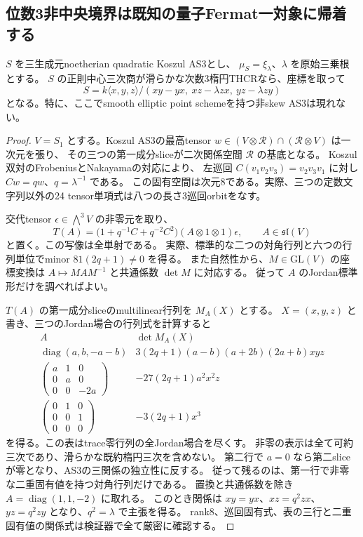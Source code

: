 \subsection{位数3非中央境界は既知の量子Fermat一対象に帰着する}
\label{subsec:normal-order3-coverage}
\begin{lemma}
\label{lem:scalar-mu3-elliptic-quantum}
$S$ を三生成元noetherian quadratic Koszul AS3とし、
$\mu_S=\xi_\lambda$、$\lambda$ を原始三乗根とする。
$S$ の正則中心三次商が滑らかな次数3楕円THCRなら、座標を取って
\[
 S=k\langle x,y,z\rangle/(xy-yx,\ xz-\lambda zx,\ yz-\lambda zy)
\]
となる。特に、ここでsmooth elliptic point schemeを持つ非skew AS3は現れない。
\end{lemma}
\begin{proof}
$V=S_1$ とする。Koszul AS3の最高tensor
$w\in(V\otimes\mathcal R)\cap(\mathcal R\otimes V)$ は一次元を張り、
その三つの第一成分sliceが二次関係空間 $\mathcal R$ の基底となる。
Koszul双対のFrobeniusとNakayamaの対応\cite{RRZ}により、
左巡回 $C(v_1v_2v_3)=v_2v_3v_1$ に対し
$Cw=qw$、$q=\lambda^{-1}$ である。
この固有空間は次元8である。実際、三つの定数文字列以外の24 tensor単項式は八つの長さ3巡回orbitをなす。

交代tensor $\epsilon\in\bigwedge^3V$ の非零元を取り、
\[
 T(A)=\bigl(1+q^{-1}C+q^{-2}C^2\bigr)(A\otimes1\otimes1)\epsilon,
 \qquad A\in\mathfrak{sl}(V)
\]
と置く。この写像は全単射である。
実際、標準的な二つの対角行列と六つの行列単位でminor $81(2q+1)\ne0$ を得る。
また自然性から、$M\in\mathrm{GL}(V)$ の座標変換は
$A\mapsto MAM^{-1}$ と共通係数 $\det M$ に対応する。
従って $A$ のJordan標準形だけを調べればよい。

$T(A)$ の第一成分sliceのmultilinear行列を $M_A(X)$ とする。
$X=(x,y,z)$ と書き、三つのJordan場合の行列式を計算すると
\[
\begin{array}{c|l}
 A&\det M_A(X)\\\hline
 \operatorname{diag}(a,b,-a-b)&
 3(2q+1)(a-b)(a+2b)(2a+b)xyz\\
 \begin{pmatrix}a&1&0\\0&a&0\\0&0&-2a\end{pmatrix}&
 -27(2q+1)a^2x^2z\\
 \begin{pmatrix}0&1&0\\0&0&1\\0&0&0\end{pmatrix}&
 -3(2q+1)x^3
\end{array}
\]
を得る。この表はtrace零行列の全Jordan場合を尽くす。
非零の表示は全て可約三次であり、滑らかな既約楕円三次を含めない。
第二行で $a=0$ なら第二sliceが零となり、AS3の三関係の独立性に反する。
従って残るのは、第一行で非零な二重固有値を持つ対角行列だけである。
置換と共通係数を除き $A=\operatorname{diag}(1,1,-2)$ に取れる。
このとき関係は
$xy=yx$、$xz=q^2zx$、$yz=q^2zy$ となり、$q^2=\lambda$ で主張を得る。
rank8、巡回固有式、表の三行と二重固有値の関係式は検証器で全て厳密に確認する。
\end{proof}

